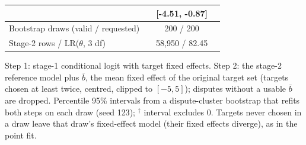 \begin{table}[!htbp]
\begin{tabular}{lccc}
 &  & [-4.51, -0.87] &  \\
\midrule
Bootstrap draws (valid / requested) & \multicolumn{3}{c}{200 / 200} \\
Stage-2 rows / LR($\theta$, 3 df) & \multicolumn{3}{c}{58,950 / 82.45} \\
\bottomrule
\end{tabular}
\begin{minipage}{0.95\linewidth}\footnotesize\smallskip Step 1: stage-1 conditional logit with target fixed effects. Step 2: the stage-2 reference model plus $\bar b$, the mean fixed effect of the original target set (targets chosen at least twice, centred, clipped to $[-5,5]$); disputes without a usable $\bar b$ are dropped. Percentile 95\% intervals from a dispute-cluster bootstrap that refits both steps on each draw (seed 123); $^{\dagger}$ interval excludes 0. Targets never chosen in a draw leave that draw's fixed-effect model (their fixed effects diverge), as in the point fit.\end{minipage}
\end{table}

